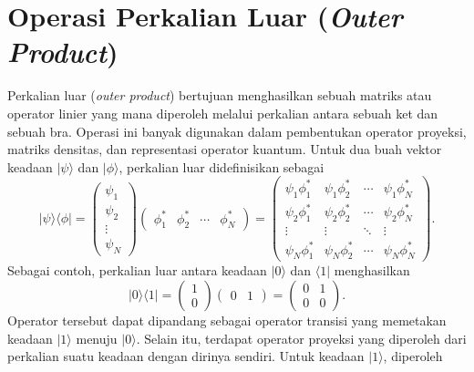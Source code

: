 \section{Operasi Perkalian Luar (\textit{Outer Product})}
Perkalian luar (\textit{outer product}) bertujuan menghasilkan sebuah matriks atau operator linier yang mana diperoleh melalui perkalian antara sebuah ket dan sebuah bra. Operasi ini banyak digunakan dalam pembentukan operator proyeksi, matriks densitas, dan representasi operator kuantum. Untuk dua buah vektor keadaan $|\psi\rangle$ dan $|\phi\rangle$, perkalian luar didefinisikan sebagai
\begin{equation}
\label{eq:outer_product_def}
    |\psi\rangle\langle\phi|
    =
    \begin{pmatrix}
        \psi_1 \\
        \psi_2 \\
        \vdots \\
        \psi_N
    \end{pmatrix}
    \begin{pmatrix}
        \phi_1^* &
        \phi_2^* &
        \cdots &
        \phi_N^*
    \end{pmatrix}
    =
    \begin{pmatrix}
        \psi_1\phi_1^* & \psi_1\phi_2^* & \cdots & \psi_1\phi_N^* \\
        \psi_2\phi_1^* & \psi_2\phi_2^* & \cdots & \psi_2\phi_N^* \\
        \vdots & \vdots & \ddots & \vdots \\
        \psi_N\phi_1^* & \psi_N\phi_2^* & \cdots & \psi_N\phi_N^*
    \end{pmatrix}.
\end{equation}
Sebagai contoh, perkalian luar antara keadaan $|0\rangle$ dan $\langle1|$ menghasilkan
\begin{equation}
\label{eq:outer_product_transisi}
    |0\rangle\langle1|
    =
    \begin{pmatrix}
        1 \\
        0
    \end{pmatrix}
    \begin{pmatrix}
        0 & 1
    \end{pmatrix}
    =
    \begin{pmatrix}
        0 & 1 \\
        0 & 0
    \end{pmatrix}.
\end{equation}
Operator tersebut dapat dipandang sebagai operator transisi yang memetakan keadaan $|1\rangle$ menuju $|0\rangle$. Selain itu, terdapat operator proyeksi yang diperoleh dari perkalian suatu keadaan dengan dirinya sendiri. Untuk keadaan $|1\rangle$, diperoleh

